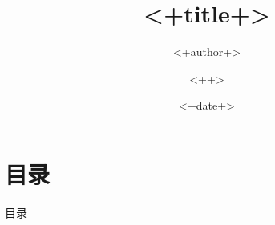 \documentclass[a4paper,fontset = windows,aspectratio=169,9pt ]{ctexbeamer}
\title{<+title+>}
\author{<+author+>\inst{1} \and <++>\inst{1}}
\institute[BNU]%
{
    \inst{1} 北京师范大学，物理与天文学院
}
\date{<+date+>}
\begin{document}
\frame{\titlepage}

\section{目录}
\begin{frame}{目录}
    \begin{columns}[t]
        \begin{column}{.48\textwidth}
            \tableofcontents[sections={1-4}] %
        \end{column}
        \begin{column}{.48\textwidth}
            \tableofcontents[sections={5-8}] %
        \end{column}
    \end{columns}
\end{frame}
\end{document}

